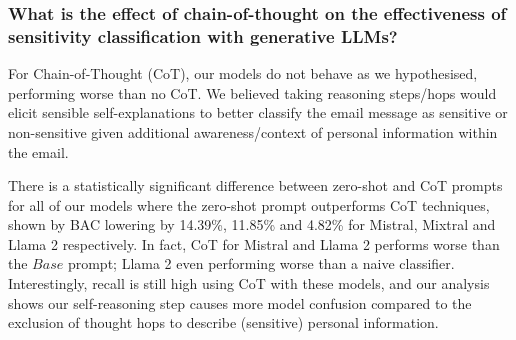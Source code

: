 \subsubsection{What is the effect of chain-of-thought on the effectiveness of sensitivity classification with generative LLMs?}

For Chain-of-Thought (CoT), our models do not behave as we hypothesised, performing worse than no CoT. We believed taking reasoning steps/hops would elicit sensible self-explanations to better classify the email message as sensitive or non-sensitive given additional awareness/context of personal information within the email. 

There is a statistically significant difference between zero-shot and CoT prompts for all of our models where the zero-shot prompt outperforms CoT techniques, shown by BAC lowering by 14.39\%, 11.85\% and 4.82\% for Mistral, Mixtral and Llama 2 respectively. In fact, CoT for Mistral and Llama 2 performs worse than the $Base$ prompt; Llama 2 even performing worse than a naive classifier. Interestingly, recall is still high using CoT with these models, and our analysis shows our self-reasoning step causes more model confusion compared to the exclusion of thought hops to describe (sensitive) personal information.

